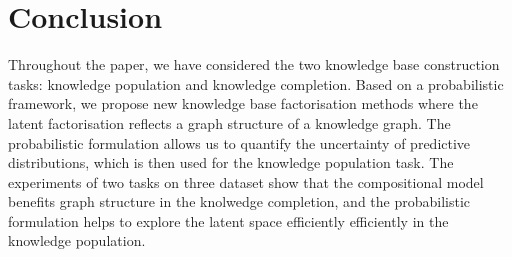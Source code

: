 \section{Conclusion}
Throughout the paper, we have considered the two knowledge base construction tasks: knowledge population and knowledge completion.
Based on a probabilistic framework, we propose new knowledge base factorisation methods where the latent factorisation reflects a graph structure of a knowledge graph. The probabilistic formulation allows us to quantify the uncertainty of predictive distributions, which is then used for the knowledge population task. The experiments of two tasks on three dataset show that the compositional model benefits graph structure in the knolwedge completion, and the probabilistic formulation helps to explore the latent space efficiently efficiently in the knowledge population.

